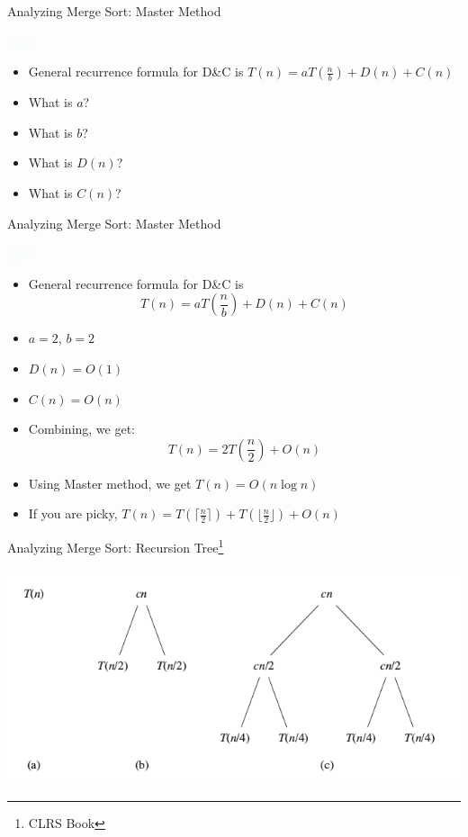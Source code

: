 \documentclass{beamer}
\newcommand{\tblue}[1]{{\Large {\textcolor{azure}{#1}}}}
\begin{document}
\begin{frame}{Analyzing Merge Sort: Master Method}

\tblue{Quiz!}
\begin{itemize}
\item General recurrence formula for D\&C is  $T(n) = a T(\frac{n}{b}) + D(n) + C(n)$
\item What is $a$?
\item What is $b$?
\item What is $D(n)$?
\item What is $C(n)$?
\end{itemize}
\end{frame}


\begin{frame}{Analyzing Merge Sort: Master Method}

\tblue{Quiz!}
\begin{itemize}
\item General recurrence formula for D\&C is  $$T(n) = a T(\frac{n}{b}) + D(n) + C(n)$$
\item $a=2$, $b=2$
\item $D(n)=O(1)$
\item $C(n)=O(n)$
\item Combining, we get: $$T(n) = 2T(\frac{n}{2}) + O(n)$$
\item Using Master method, we get $T(n) = O(n \log n)$
\item If you are picky, $T(n) = T(\lceil \frac{n}{2} \rceil) + T(\lfloor \frac{n}{2} \rfloor) + O(n)$
\end{itemize}
\end{frame}


\begin{frame}{Analyzing Merge Sort: Recursion Tree\footnote{CLRS Book}}
\begin{center}
    \includegraphics[scale=0.5]{mergeSortRecursionTree1.png}
\end{center}
\end{frame}
\end{document}

